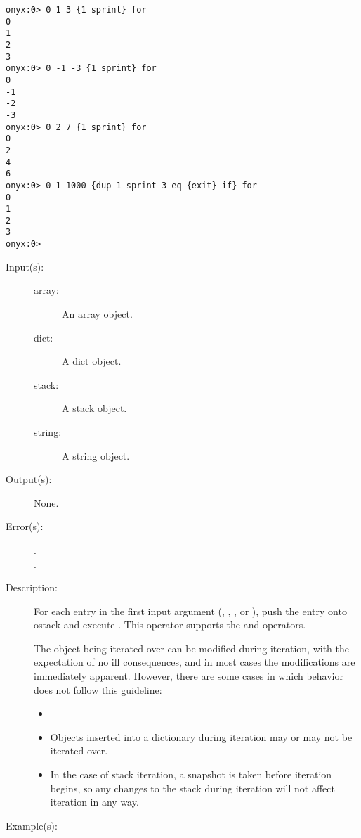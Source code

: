 \begin{description}
\begin{description}
\begin{verbatim}
onyx:0> 0 1 3 {1 sprint} for
0
1
2
3
onyx:0> 0 -1 -3 {1 sprint} for
0
-1
-2
-3
onyx:0> 0 2 7 {1 sprint} for
0
2
4
6
onyx:0> 0 1 1000 {dup 1 sprint 3 eq {exit} if} for
0
1
2
3
onyx:0>
		\end{verbatim}
	\end{description}
\label{systemdict:foreach}
\item[{\onyxop{array proc}{foreach}{--}}: ]
\item[{\onyxop{dict proc}{foreach}{--}}: ]
\item[{\onyxop{stack proc}{foreach}{--}}: ]
\item[{\onyxop{string proc}{foreach}{--}}: ]
	\begin{description}\item[]
	\item[Input(s): ]
		\begin{description}\item[]
		\item[array: ]
			An array object.
		\item[dict: ]
			A dict object.
		\item[stack: ]
			A stack object.
		\item[string: ]
			A string object.
		\end{description}
	\item[Output(s): ] None.
	\item[Error(s): ]
		\begin{description}\item[]
		\item[.]
		\item[.]
		\end{description}
	\item[Description: ]
		For each entry in the first input argument (,
		, , or ), push the entry
		onto ostack and execute .  This operator supports
		the  and
		 operators.

		The object being iterated over can be modified during iteration,
		with the expectation of no ill consequences, and in most cases
		the modifications are immediately apparent.  However, there are
		some cases in which behavior does not follow this guideline:
		\begin{itemize}\item[]
		\item{Objects inserted into a dictionary during iteration may or
			may not be iterated over.}
		\item{In the case of stack iteration, a snapshot is taken before
			iteration begins, so any changes to the stack during
			iteration will not affect iteration in any way.}
		\end{itemize}
	\item[Example(s): ]\begin{verbatim}


\end{verbatim}
\end{description}
\end{description}

